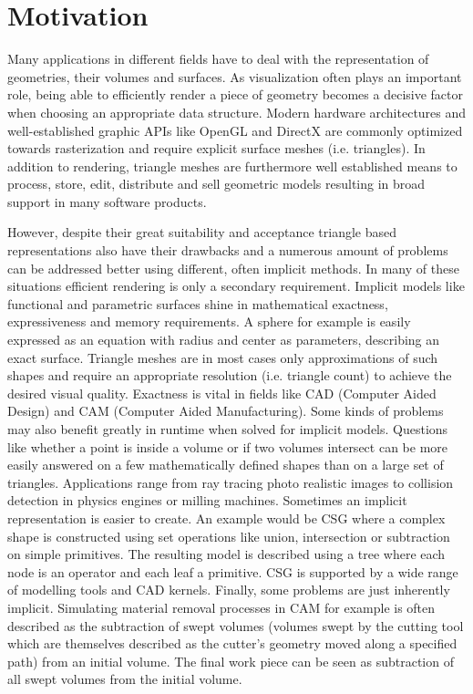 
 
\section{Motivation}

Many applications in different fields have to deal with the representation of geometries, their volumes and surfaces. As visualization often plays an important role, being able to efficiently render a piece of geometry becomes a decisive factor when choosing an appropriate data structure. Modern hardware architectures and well-established graphic APIs like OpenGL and DirectX are commonly optimized towards rasterization and require explicit surface meshes (i.e. triangles). In addition to rendering, triangle meshes are furthermore well established means to process, store, edit, distribute and sell geometric models resulting in broad support in many software products.

However, despite their great suitability and acceptance triangle based representations also have their drawbacks and a numerous amount of problems can be addressed better using different, often implicit methods. In many of these situations efficient rendering is only a secondary requirement. Implicit models like functional and parametric surfaces shine in mathematical exactness, expressiveness and memory requirements. A sphere for example is easily expressed as an equation with radius and center as parameters, describing an exact surface. Triangle meshes are in most cases only approximations of such shapes and require an appropriate resolution (i.e. triangle count) to achieve the desired visual quality. Exactness is vital in fields like CAD (Computer Aided Design) and CAM (Computer Aided Manufacturing).
Some kinds of problems may also benefit greatly in runtime when solved for implicit models. Questions like whether a point is inside a volume or if two volumes intersect can be more easily answered on a few mathematically defined shapes than on a large set of triangles. Applications range from ray tracing photo realistic images to collision detection in physics engines or milling machines. 
Sometimes an implicit representation is easier to create. An example would be CSG where a complex shape is constructed using set operations like union, intersection or subtraction on simple primitives. The resulting model is described using a tree where each node is an operator and each leaf a primitive. CSG is supported by a wide range of modelling tools and CAD kernels.
Finally, some problems are just inherently implicit. Simulating material removal processes in CAM for example is often described as the subtraction of swept volumes (volumes swept by the cutting tool which are themselves described as the cutter's geometry moved along a specified path) from an initial volume. The final work piece can be seen as subtraction of all swept volumes from the initial volume.

